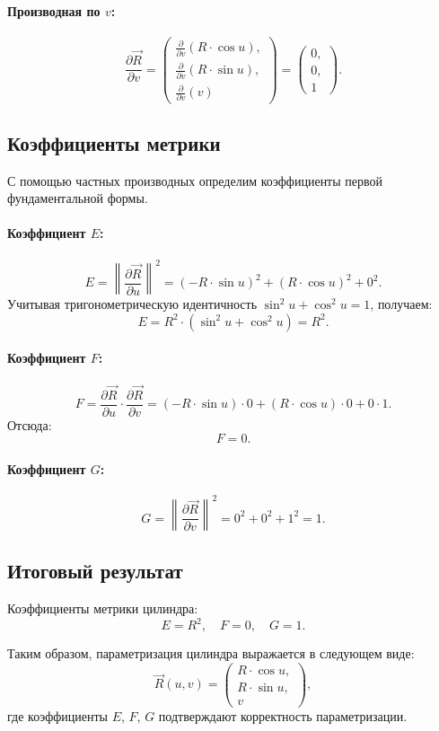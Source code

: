 \documentclass{article}
\begin{document}
\paragraph{Производная по \(v\):}
\[
\frac{\partial \vec{R}}{\partial v} = \begin{pmatrix}
\frac{\partial}{\partial v}(R \cdot \cos u), \\
\frac{\partial}{\partial v}(R \cdot \sin u), \\
\frac{\partial}{\partial v}(v)
\end{pmatrix}
= \begin{pmatrix}
0, \\
0, \\
1
\end{pmatrix}.
\]

\subsection*{Коэффициенты метрики}

С помощью частных производных определим коэффициенты первой фундаментальной формы.

\paragraph{Коэффициент \(E\):}
\[
E = \left\|\frac{\partial \vec{R}}{\partial u}\right\|^2 = (-R \cdot \sin u)^2 + (R \cdot \cos u)^2 + 0^2.
\]
Учитывая тригонометрическую идентичность \(\sin^2 u + \cos^2 u = 1\), получаем:
\[
E = R^2 \cdot (\sin^2 u + \cos^2 u) = R^2.
\]

\paragraph{Коэффициент \(F\):}
\[
F = \frac{\partial \vec{R}}{\partial u} \cdot \frac{\partial \vec{R}}{\partial v} = 
(-R \cdot \sin u) \cdot 0 + (R \cdot \cos u) \cdot 0 + 0 \cdot 1.
\]
Отсюда:
\[
F = 0.
\]

\paragraph{Коэффициент \(G\):}
\[
G = \left\|\frac{\partial \vec{R}}{\partial v}\right\|^2 = 0^2 + 0^2 + 1^2 = 1.
\]

\subsection*{Итоговый результат}

Коэффициенты метрики цилиндра:
\[
E = R^2, \quad F = 0, \quad G = 1.
\]

Таким образом, параметризация цилиндра выражается в следующем виде:
\[
\vec{R}(u, v) = \begin{pmatrix}
R \cdot \cos u, \\
R \cdot \sin u, \\
v
\end{pmatrix},
\]
где коэффициенты \(E\), \(F\), \(G\) подтверждают корректность параметризации.
                
                
\end{document}
